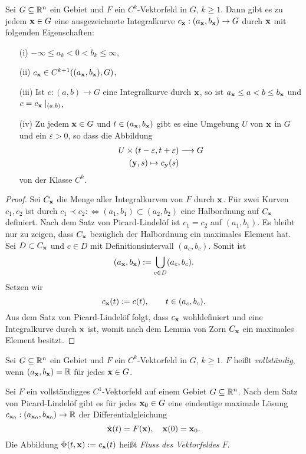 \documentclass[
pdftex,
oneside,
headsepline,
11pt, 
]{scrreprt}
\begin{document}
\begin{theo}
	Sei $G\subseteq \mathbb{R}^n$ ein Gebiet und $F$ ein $C^k$-Vektorfeld in $G$, $k\geq 1$. Dann gibt es zu jedem $\textnormal{\textbf{x}}\in G$ eine ausgezeichnete Integralkurve $c_{\textnormal{\textbf{x}}}:(a_{\textnormal{\textbf{x}}},b_{\textnormal{\textbf{x}}})\to G$ durch $\textnormal{\textbf{x}}$ mit folgenden Eigenschaften: \begin{itemize}
		\item[(i)] $-\infty\leq a_k<0<b_k\leq\infty$,
		\item[(ii)] $c_{\textnormal{\textbf{x}}}\in C^{k+1}((a_{\textnormal{\textbf{x}}},b_{\textnormal{\textbf{x}}}),G)$,
		\item[(iii)] Ist $c:(a,b)\to G$ eine Integralkurve durch $\textnormal{\textbf{x}}$, so ist $a_{\textnormal{\textbf{x}}}\leq a <b \leq b_{\textnormal{\textbf{x}}}$ und $c=c_{\textnormal{\textbf{x}}}\mid_{(a,b)}$,
		\item[(iv)] Zu jedem $\textnormal{\textbf{x}}\in G$ und $t\in (a_{\textnormal{\textbf{x}}},b_{\textnormal{\textbf{x}}})$ gibt es eine Umgebung $U$ von $\textnormal{\textbf{x}}$ in $G$ und ein $\varepsilon>0$, so dass die Abbildung \begin{align*}
		 U\times (t-\varepsilon,t+\varepsilon) &\longrightarrow G\\
		 (\textnormal{\textbf{y}},s)\mapsto c_{\textnormal{\textbf{y}}}(s)
		\end{align*}
		 von der Klasse $C^k$.
	\end{itemize}
\end{theo}
\begin{proof}
	Sei $C_{\textnormal{\textbf{x}}}$ die Menge aller Integralkurven von $F$ durch $\textnormal{\textbf{x}}$. Für zwei Kurven $c_1,c_2$ ist durch $c_1\prec c_2 :\Leftrightarrow (a_1,b_1)\subset (a_2,b_2)$ eine Halbordnung auf $C_{\textnormal{\textbf{x}}}$ definiert. Nach dem Satz von Picard-Lindelöf ist $c_1=c_2$ auf $(a_1,b_1)$. Es bleibt nur zu zeigen, dass $C_{\textnormal{\textbf{x}}}$ bezüglich der Halbordnung ein maximales Element hat. Sei $D\subset C_{\textnormal{\textbf{x}}}$ und $c\in D$ mit Definitionsintervall $(a_c,b_c)$. Somit ist \[(a_{\textnormal{\textbf{x}}},b_{\textnormal{\textbf{x}}}):=\bigcup_{c\in D}(a_c,b_c).\] Setzen wir \[ c_{\textnormal{\textbf{x}}}(t):=c(t),\qquad t\in (a_c,b_c). \] Aus dem Satz von Picard-Lindelöf folgt, dass $c_{\textnormal{\textbf{x}}}$ wohldefiniert und eine Integralkurve durch $\textnormal{\textbf{x}}$ ist, womit nach dem Lemma von Zorn $C_{\textnormal{\textbf{x}}}$ ein maximales Element besitzt.
\end{proof}
\begin{de}
	Sei $G\subseteq \mathbb{R}^n$ ein Gebiet und $F$ ein $C^k$-Vektorfeld in $G$, $k\geq 1$. $F$ heißt \textit{vollständig}, wenn $(a_{\textnormal{\textbf{x}}},b_{\textnormal{\textbf{x}}})=\mathbb{R}$ für jedes $\textnormal{\textbf{x}}\in G$.
\end{de}
\begin{de}[Fluss]
	Sei $F$ ein vollständigges $C^1$-Vektorfeld auf einem Gebiet $G\subseteq \mathbb{R}^n$. Nach dem Satz von Picard-Lindelöf gibt es für jedes $\textnormal{\textbf{x}}_0 \in G$ eine eindeutige maximale Lösung $c_{\textnormal{\textbf{x}}_0}:(a_{\textnormal{\textbf{x}}_0},b_{\textnormal{\textbf{x}}_0})\to \mathbb{R}$ der Differentialgleichung \[ \dot{\textnormal{\textbf{x}}}(t)=F(\textnormal{\textbf{x}}),\quad \textnormal{\textbf{x}}(0)=\textnormal{\textbf{x}}_0.\] Die Abbildung $\Phi(t,\textnormal{\textbf{x}}):=c_{\textnormal{\textbf{x}}}(t)$ heißt \textit{Fluss des Vektorfeldes $F$}.
\end{de}
\end{document}
